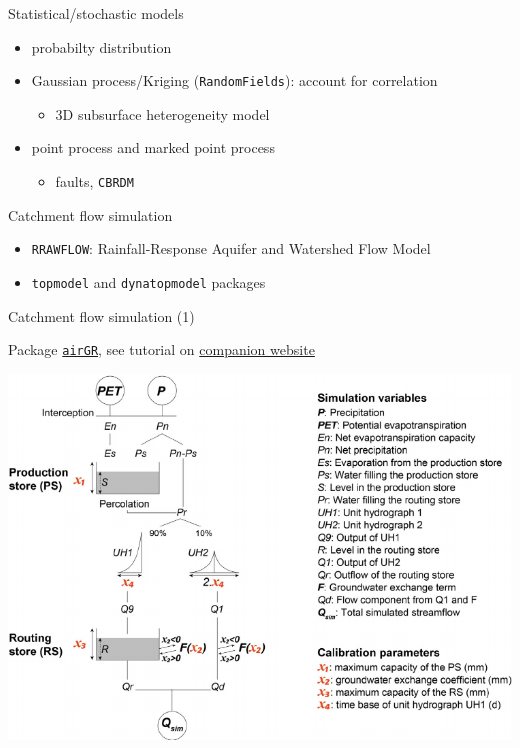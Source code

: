 \documentclass[9pt,ignorenonframetext,]{beamer}
\providecommand{\tightlist}{%
  \setlength{\itemsep}{0pt}\setlength{\parskip}{0pt}}
\begin{document}
\begin{frame}[fragile]{Statistical/stochastic models}

\begin{itemize}
\tightlist
\item
  probabilty distribution
\item
  Gaussian process/Kriging (\texttt{RandomFields}): account for
  correlation

  \begin{itemize}
  \tightlist
  \item
    3D subsurface heterogeneity model
  \end{itemize}
\item
  point process and marked point process

  \begin{itemize}
  \tightlist
  \item
    faults, \texttt{CBRDM}
  \end{itemize}
\end{itemize}

\end{frame}

\begin{frame}[fragile]{Catchment flow simulation}

\begin{itemize}
\tightlist
\item
  \texttt{RRAWFLOW}: Rainfall-Response Aquifer and Watershed Flow Model
\item
  \texttt{topmodel} and \texttt{dynatopmodel} packages
\end{itemize}

\end{frame}

\begin{frame}[fragile]{Catchment flow simulation (1)}

Package
\href{https://cran.r-project.org/web/packages/airGR/index.html}{\texttt{airGR}},
see tutorial on
\href{https://odelaigue.github.io/airGR/index.html}{companion website}

\includegraphics{imgPres/airGR_GR4J.png}

\end{frame}
\end{document}
